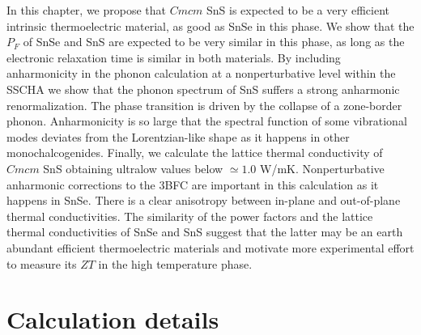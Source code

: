 In this chapter, we propose that $Cmcm$ SnS is expected to be a very efficient intrinsic thermoelectric material, as good as SnSe in this phase. We show that the $P_{F}$ of SnSe and SnS are expected to be very similar in this 
phase, as long as the electronic relaxation time is similar in both materials. By including anharmonicity in the 
phonon calculation at a nonperturbative level within the SSCHA we show that the phonon spectrum of SnS suffers 
a strong anharmonic renormalization. The phase transition is driven by the collapse of a zone-border phonon. Anharmonicity is so large that the spectral function of some vibrational modes deviates from the Lorentzian-like 
shape as it happens in other monochalcogenides\cite{ribeiro2018strong,li2014phonon}. Finally, we calculate the lattice thermal conductivity of $Cmcm$ SnS obtaining ultralow values below $\simeq 1.0$ W/mK. Nonperturbative 
anharmonic corrections to the 3BFC are important in this calculation as it happens in SnSe\cite{aseginolaza2019phonon}. There is a clear anisotropy between in-plane and out-of-plane thermal conductivities. The similarity
of the power factors and the lattice thermal conductivities of SnSe and SnS suggest that the latter may be an earth abundant efficient thermoelectric materials and motivate more experimental effort to measure its $ZT$ 
in the high temperature phase.

\section{Calculation details} 

